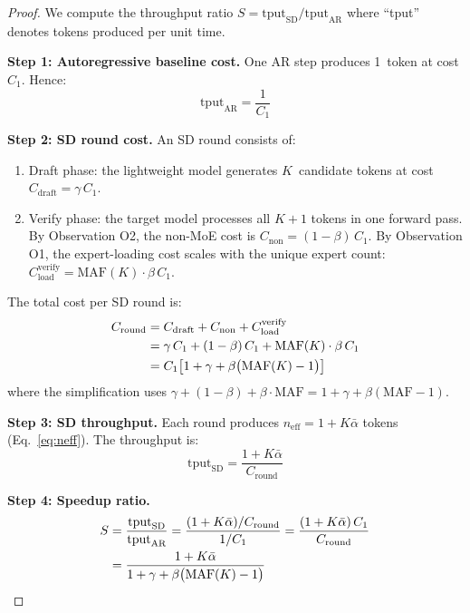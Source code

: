 \documentclass[letterpaper,twocolumn,10pt]{article}
\newcommand{\thetabar}{\bar{\alpha}}
\begin{document}
\begin{appendices}
\begin{proof}
We compute the throughput ratio $S = \text{tput}_{\text{SD}} /
\text{tput}_{\text{AR}}$ where ``tput'' denotes tokens produced per unit
time.

\textbf{Step 1: Autoregressive baseline cost.}
One AR step produces 1~token at cost $C_1$.  Hence:
\begin{equation}\label{eq:tput-ar}
  \text{tput}_{\text{AR}} = \frac{1}{C_1}
\end{equation}

\textbf{Step 2: SD round cost.}
An SD round consists of:
\begin{enumerate}[label=(\alph*),itemsep=1pt]
\item Draft phase: the lightweight model generates $K$~candidate tokens at
  cost $C_{\text{draft}} = \gamma\,C_1$.
\item Verify phase: the target model processes all $K\!+\!1$ tokens in one
  forward pass.  By Observation O2, the non-MoE cost is
  $C_{\text{non}} = (1-\beta)\,C_1$.  By Observation O1, the
  expert-loading cost scales with the unique expert count:
  $C_{\text{load}}^{\text{verify}} = \text{MAF}(K) \cdot
  \beta\,C_1$.
\end{enumerate}
The total cost per SD round is:
\begin{align}
  C_{\text{round}}
  &= C_{\text{draft}} + C_{\text{non}} + C_{\text{load}}^{\text{verify}}
     \notag\\
  &= \gamma\,C_1 + (1-\beta)\,C_1 + \text{MAF}(K) \cdot \beta\,C_1
     \notag\\
  &= C_1\bigl[1 + \gamma + \beta\bigl(\text{MAF}(K) - 1\bigr)\bigr]
     \label{eq:Cround}
\end{align}
where the simplification uses $\gamma + (1-\beta) + \beta\cdot\text{MAF}
= 1 + \gamma + \beta(\text{MAF}-1)$.

\textbf{Step 3: SD throughput.}
Each round produces $n_{\text{eff}} = 1 + K\thetabar$ tokens
(Eq.~\eqref{eq:neff}).  The throughput is:
\begin{equation}\label{eq:tput-sd}
  \text{tput}_{\text{SD}} = \frac{1 + K\thetabar}{C_{\text{round}}}
\end{equation}

\textbf{Step 4: Speedup ratio.}
\begin{align}
  S &= \frac{\text{tput}_{\text{SD}}}{\text{tput}_{\text{AR}}}
     = \frac{(1+K\thetabar)/C_{\text{round}}}{1/C_1}
     = \frac{(1+K\thetabar)\,C_1}{C_{\text{round}}} \notag\\
    &= \frac{1+K\thetabar}
            {1 + \gamma + \beta\bigl(\text{MAF}(K) - 1\bigr)}
       \label{eq:S-derivation}
\end{align}


\end{proof}
\end{appendices}
\end{document}
